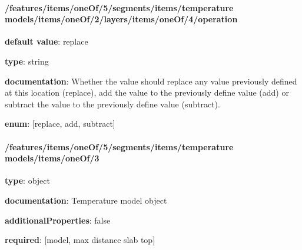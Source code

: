 \begin{itemized}
\end{itemized}\paragraph{/features/items/oneOf/5/segments/items/temperature models/items/oneOf/2/layers/items/oneOf/4/operation} \begin{itemized}
\item {\bf default value}: replace
\item {\bf type}: string
\item {\bf documentation}: Whether the value should replace any value previously defined at this location (replace), add the value to the previously define value (add) or subtract the value to the previously define value (subtract).
\item {\bf enum}: [replace, add, subtract]\end{itemized}\paragraph{/features/items/oneOf/5/segments/items/temperature models/items/oneOf/3} \begin{itemized}
\item {\bf type}: object
\item {\bf documentation}: Temperature model object
\item {\bf additionalProperties}: false
\item {\bf required}: [model, max distance slab top]\end{itemized}
